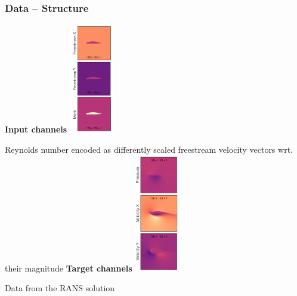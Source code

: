 \begin{frame}
    \frametitle{Data -- Structure}
\vspace*{0.8cm}

\begin{multicols}{2}
    \textbf{Input channels}\newline
    \vspace*{0.6cm}
    \includegraphics[width=0.15\textwidth, height=.45\textheight]{./Ressourcen/Praesentation/Bilder/sampleInput.png}

  
   
\vspace*{-0.9cm}
Reynolds number encoded as differently scaled \newline freestream velocity vectors wrt. their magnitude
    \vfill\columnbreak
    \textbf{Target channels}\newline
    \vspace*{0.6cm}
    \includegraphics[width=0.15\textwidth, height=.45\textheight]{./Ressourcen/Praesentation/Bilder/sampleTarget.png}

  
   
\vspace*{-0.9cm}
Data from the RANS solution
\end{multicols}

\end{frame}
\clearpage

